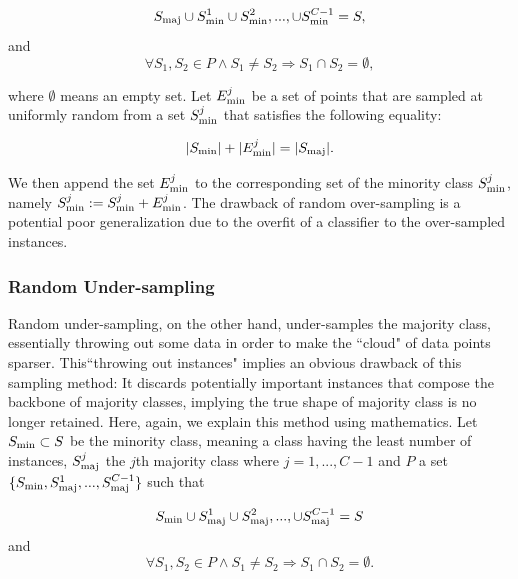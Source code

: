 	\begin{equation}
	S_{\rm{maj}} \cup S_{\rm{min}}^{1} \cup S_{\rm{min}}^{2},..., \cup S_{\rm{min}}^{C-1} = S,
	\end{equation}
	and
	\begin{equation}
	\forall S_1,S_2 \in P \land S_1 \neq S_2 \Rightarrow S_1 \cap S_2 = \emptyset,
	\end{equation}

	
where $\emptyset$ means an empty set. Let $E_{\rm{min}}^j$ be a set of points that are sampled at uniformly random from a set $S_{\rm{min}}^{j}$ that satisfies the following equality:

	\begin{equation}
	|S_{\rm{min}}| + | E_{\rm{min}}^j | = |S_{\rm{maj}}|.
	\end{equation}
	
 We then append the set $E_{\rm{min}}^j$ to the corresponding set of the minority class $S_{\rm{min}}^{j}$, namely $S_{\rm{min}}^{j} := S_{\rm{min}}^{j} + E_{\rm{min}}^j$. The drawback of random over-sampling is a potential poor generalization due to the overfit of a classifier to the over-sampled instances.
	
	\subsubsection*{Random Under-sampling}
	Random under-sampling, on the other hand, under-samples the majority class, essentially throwing out some data in order to make the ``cloud" of data points sparser. This``throwing out instances" implies an obvious drawback of this sampling method: It discards potentially important instances that compose the backbone of majority classes, implying the true shape of majority class is no longer retained. Here, again, we explain this method using mathematics. Let $S_{\rm{min}} \subset S$ be the minority class, meaning a class having the least number of instances, $S_{\rm{maj}}^{j}$ the $j$th majority class where $j = 1,...,C-1$ and $P$ a set $\{S_{\rm{min}}, S_{\rm{maj}}^{1},...,S_{\rm{maj}}^{C-1} \}$ such that

	\begin{equation}
	S_{\rm{min}} \cup S_{\rm{maj}}^{1} \cup S_{\rm{maj}}^{2},..., \cup S_{\rm{maj}}^{C-1} = S
	\end{equation}
	and
	\begin{equation}
	\forall S_1,S_2 \in P \land S_1 \neq S_2 \Rightarrow S_1 \cap S_2 = \emptyset.
	\end{equation}
	
